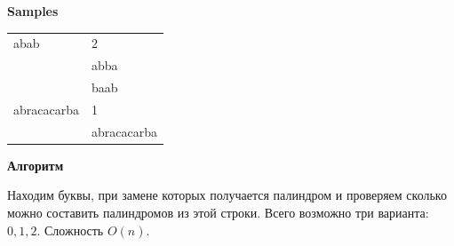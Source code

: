 \documentclass[a4paper,12pt]{article}
\begin{document}
\textbf{Samples} 

\begin{table}[ht!]
\centering
\label{my-tab100}
\begin{tabular}{|l|l|}
\hline

abab & 2 \\ & abba \\ & baab \\ \hline
abracacarba & 1 \\ & abracacarba \\ \hline

\end{tabular}
\end{table}

\textbf{{\large Алгоритм}}

Находим буквы, при замене которых получается палиндром и проверяем сколько можно составить палиндромов из этой строки. Всего возможно три варианта: $0, 1, 2$. Сложность $O(n)$.
\end{document}

